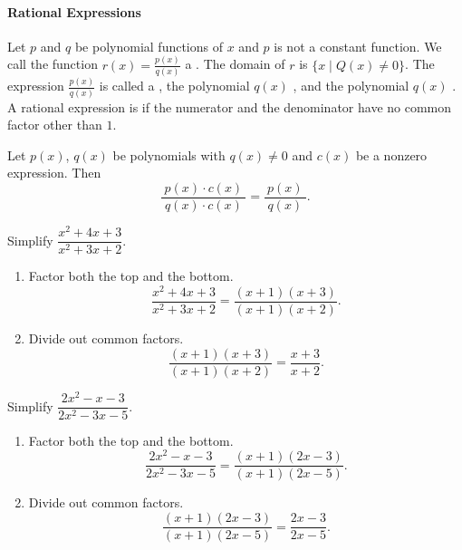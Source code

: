 
\paragraph*{Rational Expressions}
	Let $p$ and $q$ be polynomial functions of $x$ and $p$ is not a constant function. We call the function $r(x)=\frac{p(x)}{q(x)}$ a . The domain of $r$ is $\{x\mid Q(x)\neq 0\}$.
	The expression $\frac{p(x)}{q(x)}$ is called a , the polynomial $q(x)$ , and the polynomial $q(x)$ .
	A rational expression is  if the numerator and the denominator have no common factor other than $1$.

	Let $p(x)$, $q(x)$ be polynomials with $q(x)\neq 0$ and $c(x)$ be a nonzero expression. Then
	$$
	\dfrac{~p(x)\cdot c(x)~}{~q(x)\cdot c(x)~}=\dfrac{~p(x)~}{~q(x)~}.
	$$




	\begin{multicols}{2}
		\begin{example}
			Simplify $\dfrac{x^2+4x+3}{x^2+3x+2}$.
		\end{example}
		\vspace*{-0.25\baselineskip}
		\begin{solution}\mbox{}
			\begin{enumerate}[label={\textbf{\textup{Step \arabic*.}}~}]
				\item Factor both the top and the bottom.
				      \[
					      \dfrac{x^2+4x+3}{x^2+3x+2}=\dfrac{(x+1)(x+3)}{(x+1)(x+2)}.
				      \]
				\item Divide out common factors. 
				      \[
					      \dfrac{(x+1)(x+3)}{(x+1)(x+2)}=\dfrac{x+3}{x+2}.
				      \]
			\end{enumerate}
		\end{solution}

		\columnbreak

		\begin{example}
			Simplify $\dfrac{2x^2-x-3}{2x^2-3x-5}$.
		\end{example}
		\vspace*{-0.25\baselineskip}
		\begin{solution}\mbox{}
			\begin{enumerate}[label={\textbf{\textup{Step \arabic*.}}~}]
				\item Factor both the top and the bottom.
				      \[\dfrac{2x^2-x-3}{2x^2-3x-5}=\dfrac{(x+1)(2x-3)}{(x+1)(2x-5)}.\]
				\item Divide out common factors.
				      \[\dfrac{(x+1)(2x-3)}{(x+1)(2x-5)}=\dfrac{2x-3}{2x-5}.\]
			\end{enumerate}
		\end{solution}
	\end{multicols}



